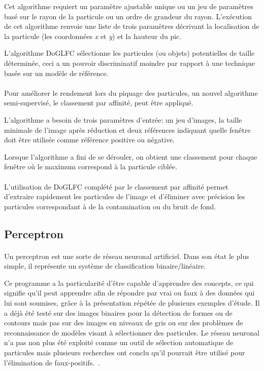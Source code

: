 \noindent
Cet algorithme requiert un paramètre ajustable unique ou un jeu de paramètres basé sur le rayon de la particule ou un ordre de grandeur du rayon. L'exécution de cet algorithme renvoie une liste de trois paramètres décrivant la localisation de la particule (les coordonnées \emph{x} et \emph{y}) et la hauteur du pic.%

\noindent
L'algorithme DoGLFC sélectionne les particules (ou objets) potentielles de taille déterminée, ceci a un pouvoir discriminatif moindre par rapport à une technique basée sur un modèle de référence.

\paragraph*{}
Pour améliorer le rendement lors du piquage des particules, un nouvel algorithme semi-supervisé, le classement par affinité, peut \^etre appliqué.

\noindent
L’algorithme a besoin de trois paramètres d'entrée: un jeu d'images, la taille minimale de l'image après réduction et deux références indiquant quelle fen\^etre doit \^etre utilisée comme référence positive ou négative.

\noindent
Lorsque l'algorithme a fini de se dérouler, on obtient une classement pour chaque fen\^etre où le maximum correspond à la particule ciblée.

\paragraph*{}
L'utilisation de DoGLFC complété par le classement par affinité permet d'extraire
rapidement les particules de l'image et d'éliminer avec précision les particules correspondant à de la contamination ou du bruit de fond.

\subsection{Perceptron}

\paragraph*{}
Un perceptron est une sorte de réseau neuronal artificiel. Dans son état le plus simple, il représente un système de classification binaire/linéaire.%

\noindent
Ce programme a la particularité d'être capable d'apprendre des concepts, ce qui signifie qu'il peut apprendre afin de répondre par vrai ou faux à des données qui lui sont soumises, gr\^ace à la présentation répétée de plusieurs exemples d'étude.
Il a déjà été testé sur des images binaires pour la détection de formes ou de contours mais pas sur des images en niveaux de gris ou sur des problèmes de reconnaissance de modèles visant à sélectionner des particules. Le réseau neuronal n'a pas non plus été exploité comme un outil de sélection automatique de particules mais plusieurs recherches ont conclu qu'il pourrait \^etre utilisé pour l'élimination de faux-positifs.~\cite{Perceptron:article}.%

